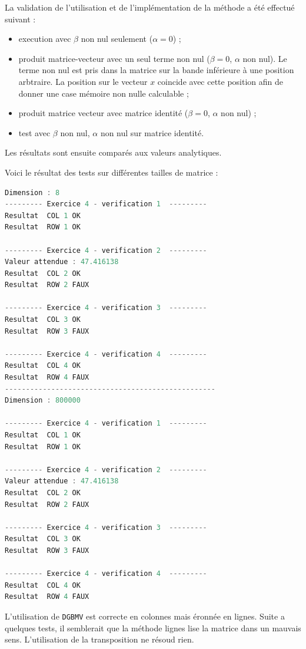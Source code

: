 \documentclass[12pt]{report}
\begin{document}
La validation de l'utilisation et de l'implémentation de la méthode a été effectué suivant :
\begin{itemize}
\item execution avec $\beta$ non nul seulement ($\alpha = 0$) ;
\item produit matrice-vecteur avec un seul terme non nul ($\beta = 0$, $\alpha$ non nul). Le terme non nul est pris dans la matrice sur la bande inférieure à une position arbtraire. La position sur le vecteur $x$ coincide avec cette position afin de donner une case mémoire non nulle calculable ; 
\item produit matrice vecteur avec matrice identité ($\beta = 0$, $\alpha$ non nul) ;
\item test avec $\beta$ non nul, $\alpha$ non nul sur matrice identité.
\end{itemize}
Les résultats sont ensuite comparés aux valeurs analytiques. 

Voici le résultat  des tests sur différentes tailles de matrice  :

\begin{lstlisting}[language=C, caption=Vérification de l'implémentation de DGBMV]
Dimension : 8
--------- Exercice 4 - verification 1  ---------
Resultat  COL 1 OK
Resultat  ROW 1 OK

--------- Exercice 4 - verification 2  ---------
Valeur attendue : 47.416138
Resultat  COL 2 OK
Resultat  ROW 2 FAUX

--------- Exercice 4 - verification 3  ---------
Resultat  COL 3 OK
Resultat  ROW 3 FAUX

--------- Exercice 4 - verification 4  ---------
Resultat  COL 4 OK
Resultat  ROW 4 FAUX
--------------------------------------------------
Dimension : 800000

--------- Exercice 4 - verification 1  ---------
Resultat  COL 1 OK
Resultat  ROW 1 OK

--------- Exercice 4 - verification 2  ---------
Valeur attendue : 47.416138
Resultat  COL 2 OK
Resultat  ROW 2 FAUX

--------- Exercice 4 - verification 3  ---------
Resultat  COL 3 OK
Resultat  ROW 3 FAUX

--------- Exercice 4 - verification 4  ---------
Resultat  COL 4 OK
Resultat  ROW 4 FAUX
\end{lstlisting}

L'utilisation de \texttt{DGBMV} est correcte en colonnes mais éronnée en lignes. Suite a quelques tests, il semblerait que la méthode lignes lise la matrice dans un mauvais sens. L'utilisation de la transposition ne résoud rien.
\end{document}
